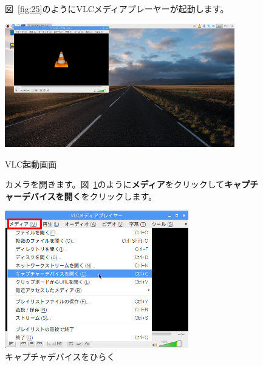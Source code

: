 \begin{figure}[ht]
  図~\ref{fig:25}のようにVLCメディアプレーヤーが起動します。

  \centering
  \begin{minipage}{10cm}
    \includegraphics[width=10cm]{text01-img/textbook-img114.jpg}
    \caption{VLC起動画面}\label{fig:25}
  \end{minipage}



  \flushleft
  カメラを開きます。図~\ref{fig:27}のように\textbf{メディア}をクリックして\textbf{キャプチャーデバイスを開く}をクリックします。


  \centering
  \begin{minipage}{8.096cm}
    {\upshape
      \includegraphics[width=8.0cm]{text01-img/textbook-img116.png}
      \caption{キャプチャデバイスをひらく}\label{fig:27}
    }
  \end{minipage}


\end{figure}
